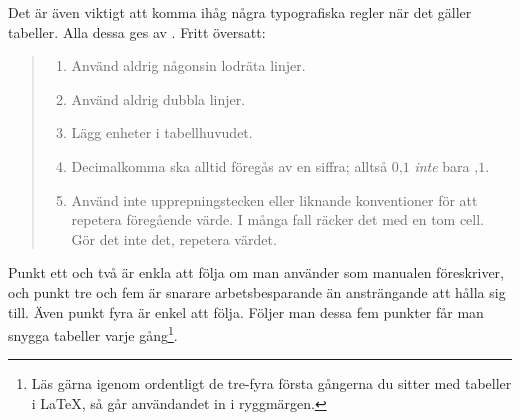 \documentclass[10pt,../../a4.tex]{subfiles}
\begin{document}
Det är även viktigt att komma ihåg några typografiska regler när det
gäller tabeller. Alla dessa ges av \textcite[3]{Fear05}. Fritt
översatt:
\begin{quotation}%
	\noindent\vspace{-\baselineskip}%
	\begin{enumerate}
		\item Använd aldrig någonsin lodräta linjer.
		\item Använd aldrig dubbla linjer.
		\item Lägg enheter i tabellhuvudet.
		\item Decimalkomma ska alltid föregås av en siffra; alltså \(0{\mathord,}1\) 
		\emph{inte} bara \({\mathord,}1\).
		\item Använd inte upprepningstecken eller liknande konventioner 
		för att repetera föregående värde. I många fall räcker det med en 
		tom cell. Gör det inte det, repetera värdet.
	\end{enumerate}
\end{quotation}

Punkt ett och två är enkla att följa om man använder  som
manualen föreskriver, och punkt tre och fem är snarare arbetsbesparande än
ansträngande att hålla sig till. Även punkt fyra är enkel att följa. 
Följer man
dessa fem punkter får man snygga tabeller varje gång\footnote{Läs gärna
igenom \textcite{Fear05} ordentligt de tre-fyra första gångerna du
sitter med tabeller i \LaTeX, så går användandet in i ryggmärgen.}.
\end{document}
